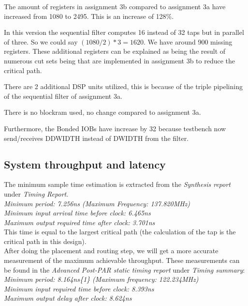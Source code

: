 \documentclass[a4paper,twoside,11pt, fleqn]{article}
\begin{document}
The amount of registers in assignment 3b compared to assignment 3a have increased from 1080 to 2495. This is an increase of 128\%.

\smallskip 
In this version the sequential filter computes 16 instead of 32 taps but in parallel of three. So we could say $(1080/2)*3=1620$. We have around 900 missing registers. These additional registers can be explained as being the result of numerous cut sets being that are implemented in assignment 3b to reduce the critical path.

\smallskip
There are 2 additional DSP units utilized, this is because of the triple pipelining of the sequential filter of assignment 3a.

\smallskip
There is no blockram used, no change compared to assignment 3a.

\smallskip
Furthermore, the Bonded IOBs have increase by 32 because testbench now send/receives DDWIDTH instead of DWIDTH from the filter.

\subsection{System throughput and latency}
\label{sec:thr3b}
The minimum sample time estimation is extracted from the \textit{Synthesis report} under \textit{Timing Report}.\\

   \textit{Minimum period:  7.256ns (Maximum Frequency: 137.820MHz)\\
   Minimum input arrival time before clock: 6.465ns\\
   Maximum output required time after clock: 3.701ns}\\

This time is equal to the largest critical path (the calculation of the tap is the critical path in this design).\\

After doing the placement and routing step, we will get a more accurate measurement of the maximum achievable throughput. These measurements can be found in the \textit{Advanced Post-PAR static timing report} under \textit{Timing summary}:\\

\textit{Minimum period:   8.164ns\{1\}   (Maximum frequency: 122.234MHz)\\
   Minimum input required time before clock:   8.393ns\\
   Maximum output delay after clock:   8.624ns}\\
\end{document}
